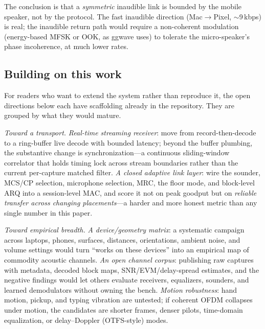 \documentclass[11pt]{article}
\begin{document}
The conclusion is that a \emph{symmetric} inaudible link is bounded by the
mobile speaker, not by the protocol. The fast inaudible direction
(Mac$\rightarrow$Pixel, $\sim$9\,kbps) is real; the inaudible return path would
require a non-coherent modulation (energy-based MFSK or OOK, as ggwave uses)
to tolerate the micro-speaker's phase incoherence, at much lower rates.

\subsection{Building on this work}
\label{sec:extend}

For readers who want to extend the system rather than reproduce it, the open
directions below each have scaffolding already in the repository. They are
grouped by what they would mature.

\emph{Toward a transport.} \emph{Real-time streaming receiver}: move from
record-then-decode to a ring-buffer live decode with bounded latency; beyond
the buffer plumbing, the substantive change is synchronization---a
continuous sliding-window correlator that holds timing lock across stream
boundaries rather than the current per-capture matched filter. \emph{A
closed adaptive link layer}: wire the sounder, MCS/CP selection, microphone
selection, MRC, the floor mode, and block-level ARQ into a session-level
MAC, and score it not on peak goodput but on \emph{reliable transfer across
changing placements}---a harder and more honest metric than any single
number in this paper.

\emph{Toward empirical breadth.} \emph{A device/geometry matrix}: a
systematic campaign across laptops, phones, surfaces, distances,
orientations, ambient noise, and volume settings would turn ``works on
these devices'' into an empirical map of commodity acoustic channels.
\emph{An open channel corpus}: publishing raw captures with metadata,
decoded block maps, SNR/EVM/delay-spread estimates, and the negative
findings would let others evaluate receivers, equalizers, sounders, and
learned demodulators without owning the bench. \emph{Motion robustness}:
hand motion, pickup, and typing vibration are untested; if coherent OFDM
collapses under motion, the candidates are shorter frames, denser pilots,
time-domain equalization, or delay--Doppler (OTFS-style) modes.
\end{document}
